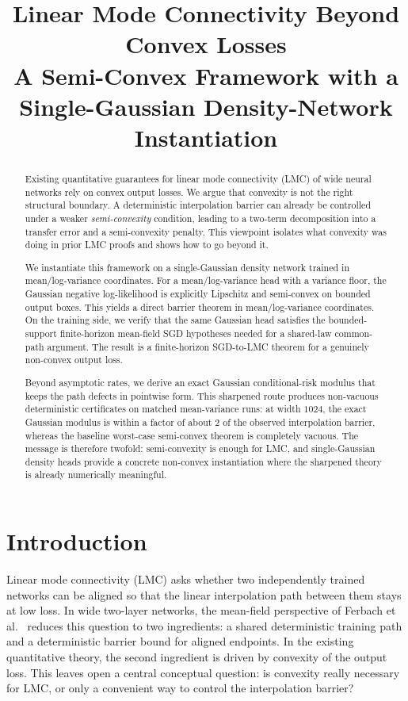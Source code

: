 \documentclass[11pt]{article}
\title{Linear Mode Connectivity Beyond Convex Losses\\A Semi-Convex Framework with a Single-Gaussian Density-Network Instantiation}
\author{}
\date{}
\theoremstyle{definition}
\begin{document}
\maketitle

\begin{abstract}
Existing quantitative guarantees for linear mode connectivity (LMC) of wide
neural networks rely on convex output losses. We argue that convexity is not
the right structural boundary. A deterministic interpolation barrier can already
be controlled under a weaker \emph{semi-convexity} condition, leading to a
two-term decomposition into a transfer error and a semi-convexity penalty.
This viewpoint isolates what convexity was doing in prior LMC proofs and shows
how to go beyond it.

We instantiate this framework on a single-Gaussian density network trained in
mean/log-variance coordinates. For a mean/log-variance head with a variance
floor, the Gaussian negative log-likelihood is explicitly Lipschitz and
semi-convex on bounded output boxes. This yields a direct barrier theorem in
mean/log-variance coordinates. On the training side, we verify that the same Gaussian
head satisfies the bounded-support finite-horizon
mean-field SGD hypotheses needed for a shared-law common-path argument. The
result is a finite-horizon SGD-to-LMC theorem for a genuinely non-convex output
loss.

Beyond asymptotic rates, we derive an exact Gaussian conditional-risk modulus that
keeps the path defects in pointwise form. This sharpened route produces
non-vacuous deterministic certificates on matched mean-variance runs: at width
$1024$, the exact Gaussian modulus is within a factor of about $2$ of the observed
interpolation barrier, whereas the baseline worst-case semi-convex theorem is
completely vacuous. The message is therefore twofold: semi-convexity is enough
for LMC, and single-Gaussian density heads provide a concrete non-convex
instantiation where the sharpened theory is already numerically meaningful.
\end{abstract}

\section{Introduction}
\label{sec:intro}

Linear mode connectivity (LMC) asks whether two independently trained networks
can be aligned so that the linear interpolation path between them stays at low
loss. In wide two-layer networks, the mean-field perspective of
Ferbach et al.~\cite{Ferbach2024} reduces this question to two ingredients: a
shared deterministic training path and a deterministic barrier bound for aligned
endpoints. In the existing quantitative theory, the second ingredient is driven
by convexity of the output loss. This leaves open a central conceptual question:
is convexity really necessary for LMC, or only a convenient way to control the
interpolation barrier?
\end{document}
